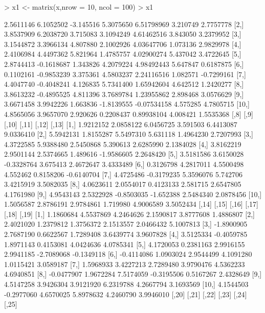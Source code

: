 \documentclass[12pt]{article}
\begin{document}
\begin{Schunk}
\begin{Sinput}
> x1 <- matrix(x,nrow = 10, ncol = 100) 
> x1
\end{Sinput}
\begin{Soutput}
           [,1]       [,2]      [,3]       [,4]        [,5]     [,6]       [,7]
 [1,] 2.5611146  6.1052502 -3.145516  5.3075650  6.51798969 3.210749  2.7757778
 [2,] 3.8537909  6.2038720  3.715083  3.1094249  4.61462516 3.843050  3.2379952
 [3,] 3.1544872  3.3966134  4.807880  2.1002926  4.03647706 1.073136  2.9829978
 [4,] 2.4106984  4.4497362  5.821964  1.4785757  4.02900274 5.437042  3.4722645
 [5,] 2.8744413 -0.1618687  1.343826  4.2079224  4.98492443 5.647847  0.6187875
 [6,] 0.1102161 -0.9853239  3.375361  4.5803237  2.24116516 1.082571 -0.7299161
 [7,] 4.4047740 -0.4048241  4.126835  5.7341400  1.65942604 4.642512  1.2420277
 [8,] 3.8613232 -0.4895525  4.811396  3.7689784  1.23955862 2.898468  3.0576629
 [9,] 3.6671458  3.9942226  1.663836 -1.8139555 -0.07534158 4.575285  4.7805715
[10,] 4.8565056  3.9657070  2.920626  0.2208437  0.89938104 4.008421  1.5535368
           [,8]       [,9]      [,10]     [,11]      [,12]      [,13]
 [1,] 1.9212152  2.0858122  6.0456725  3.591503  6.4413087  9.0336410
 [2,] 5.5942131  1.8155287  5.5497310  5.631118  1.4964230  2.7207993
 [3,] 4.3722585  5.9388480  2.5450868  5.390613  2.6285990  2.1384028
 [4,] 3.8162219  2.9501144  2.5374665  1.489616 -1.9586605  2.2648420
 [5,] 3.5181586  3.6150028 -0.3328764  3.675413  2.4672647  3.4333489
 [6,] 0.3126798  4.2817011  4.5500498  4.552462  0.8158206 -0.6140704
 [7,] 4.4725486 -0.3179235  5.3596076  5.742706  3.4215919  3.5082035
 [8,] 4.0623611  2.0554017  0.4123133  2.581715  2.6547805  4.1761980
 [9,] 4.9543143  2.5322928 -0.8503035 -1.652388  2.5484340  2.0878456
[10,] 1.5056587  2.8786191  2.9784861  1.719980  4.9006589  3.5052434
           [,14]      [,15]     [,16]      [,17]      [,18]      [,19]
 [1,]  1.1860684  4.5537869 4.2464626  2.1590817  3.8777608  1.4886807
 [2,]  2.4021020  1.2379812 1.3756372  2.1513557  2.0466432  5.1007813
 [3,] -1.8900905  2.7687190 0.6622567  1.7289408  3.6439774  3.9607828
 [4,]  3.5125334 -0.4059785 1.8971143  0.4153081  4.0424636  4.0785341
 [5,]  4.1720053  0.2381163 2.9916155  2.9941185 -2.7089068 -0.1349118
 [6,] -0.4114086  1.0903024 2.9544499  4.1091280  1.0115421  3.0589187
 [7,]  1.5968933  3.4227213 2.7289480  3.9790476  4.5362233  4.6940851
 [8,] -0.0477907  1.9672284 7.5174059 -0.3195506  0.5167267  2.4328649
 [9,]  4.5147258  3.9426304 3.9121920  6.2319788  4.2667794  3.1693569
[10,]  4.1544503 -0.2977060 4.6570025  5.8978632  4.2460790  3.9946010
           [,20]      [,21]      [,22]        [,23]     [,24]       [,25]

\end{Soutput}
\end{Schunk}
\end{document}
